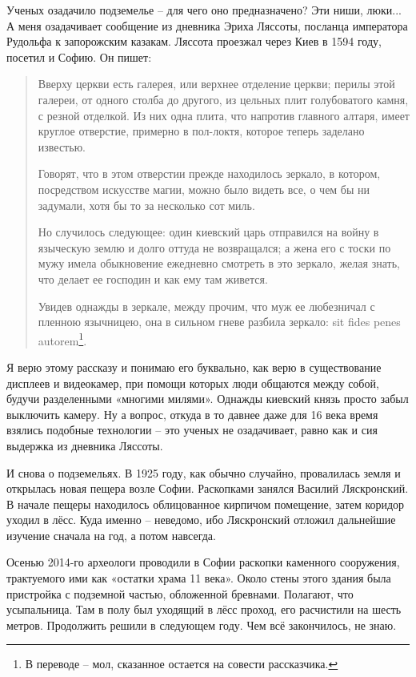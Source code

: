 Ученых озадачило подземелье – для чего оно предназначено? Эти ниши, люки... А меня озадачивает сообщение из дневника Эриха Ляссоты, посланца императора Рудольфа к запорожским казакам. Ляссота проезжал через Киев в 1594 году, посетил и Софию. Он пишет\cite{sbornikmat}:

\begin{quotation}
Вверху церкви есть галерея, или верхнее отделение церкви; перилы этой галереи, от одного столба до другого, из цельных плит голубоватого камня, с резной отделкой. Из них одна плита, что напротив главного алтаря, имеет круглое отверстие, примерно в пол-локтя, которое теперь заделано известью.

Говорят, что в этом отверстии прежде находилось зеркало, в котором, посредством искусстве магии, можно было видеть все, о чем бы ни задумали, хотя бы то за несколько сот миль.

Но случилось следующее: один киевский царь отправился на войну в языческую землю и долго оттуда не возвращался; а жена его с тоски по мужу имела обыкновение ежедневно смотреть в это зеркало, желая знать, что делает ее господин и как ему там живется.

Увидев однажды в зеркале, между прочим, что муж ее любезничал с пленною язычницею, она в сильном гневе разбила зеркало: sit fides penes autorem\footnote{В переводе – мол, сказанное остается на совести рассказчика.}.
\end{quotation}

Я верю этому рассказу и понимаю его буквально, как верю в существование дисплеев и видеокамер, при помощи которых люди общаются между собой, будучи разделенными «многими милями». Однажды киевский князь просто забыл выключить камеру. Ну а вопрос, откуда в то давнее даже для 16 века время взялись подобные технологии – это ученых не озадачивает, равно как и сия выдержка из дневника Ляссоты.

И снова о подземельях. В 1925 году, как обычно случайно, провалилась земля и открылась новая пещера возле Софии. Раскопками занялся Василий Ляскронский. В начале пещеры находилось облицованное кирпичом помещение, затем коридор уходил в лёсс. Куда именно – неведомо, ибо Ляскронский отложил дальнейшие изучение сначала на год, а потом навсегда.

Осенью 2014-го археологи проводили в Софии раскопки каменного сооружения, трактуемого ими как «остатки храма 11 века». Около стены этого здания была пристройка с подземной частью, обложенной бревнами. Полагают, что усыпальница. Там в полу был уходящий в лёсс проход, его расчистили на шесть метров. Продолжить решили в следующем году. Чем всё закончилось, не знаю.

